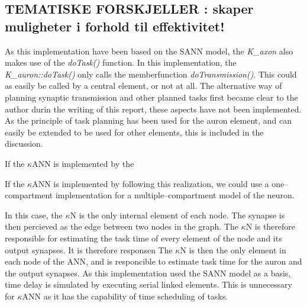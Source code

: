 \subsection{TEMATISKE FORSKJELLER : skaper muligheter i forhold til effektivitet!}
		As this implementation have been based on the SANN model, the \emph{K\_axon} also makes use of the \emph{doTask()} function.
		In this implementation, the \emph{K\_auron::doTask()} only calls the memberfunction \emph{doTransmission()}. This could as easily be called by a central element, or not at all. %
		The alternative way of planning synaptic transmission and other planned tasks first became clear to the author durin the writing of this report, these aspects have not been implemented.
		As the principle of task planning has been used for the auron element, and can easily be extended to be used for other elements, this is included in the discussion.


		If the $\kappa$ANN is implemented by the 

		If the $\kappa$ANN is implemented by following this realization, we could use a one--compartment implementation for a multiple--compartment model of the neuron.

		In this case, the $\kappa$N is the only internal element of each node. The synapse is then percieved as the edge between two nodes in the graph.
		The $\kappa$N is therefore responsible for estimating the task time of every element of the node and its output synapses.
		It is therefore responsen
		The $\kappa$N is then the only element in each node of the ANN, and is responcible to estimate task time for the auron and the output synapses.
		As this implementation used the SANN model as a basis, time delay is simulated by executing serial linked elements.
		This is unnecessary for $\kappa$ANN as it has the capability of time scheduling of tasks.

